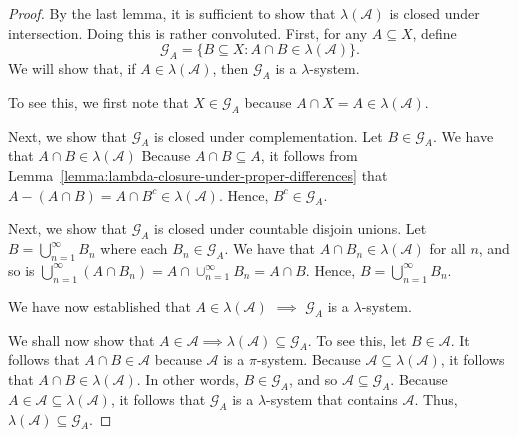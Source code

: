 \documentclass[10pt]{article}
\newcommand{\mcal}[1]{\mathcal{#1}}
\begin{document}
\begin{itemize}
\begin{proof}
    By the last lemma, it is sufficient to show that $\lambda(\mcal{A})$ is closed under intersection. Doing this is rather convoluted. First, for any $A \subseteq X$, define $$\mcal{G}_A = \{ B \subseteq X : A \cap B \in \mcal{\lambda}(\mcal{A}) \}.$$
    We will show that, if $A \in \lambda(\mcal{A})$, then $\mcal{G}_A$ is a $\lambda$-system. 

    To see this, we first note that $X \in \mcal{G}_A$ because $A \cap X = A \in \lambda(\mcal{A})$. 
    
    Next, we show that $\mcal{G}_A$ is closed under complementation. Let $B \in \mcal{G}_A$. We have that $A \cap B \in \lambda(\mcal{A})$ Because $A \cap B \subseteq A$, it follows from Lemma~\ref{lemma:lambda-closure-under-proper-differences} that $A - (A \cap B) = A \cap B^c \in \lambda(\mcal{A})$. Hence, $B^c \in \mcal{G}_A$.

    Next, we show that $\mcal{G}_A$ is closed under countable disjoin unions. Let $B = \bigcup_{n=1}^\infty B_n$ where each $B_n \in \mcal{G}_A$. We have that $A \cap B_n \in \lambda(\mcal{A})$ for all $n$, and so is $\bigcup_{n=1}^\infty (A \cap B_n) = A \cap \cup_{n=1}^\infty B_n = A \cap B$. Hence, $B = \bigcup_{n=1}^\infty B_n$.

    We have now established that $A \in \lambda(\mcal{A})$ $\implies$ $\mcal{G}_A$ is a $\lambda$-system.

    We shall now show that $A \in \mcal{A} \implies \lambda(\mcal{A}) \subseteq \mcal{G}_A$. To see this, let $B \in \mcal{A}$. It follows that $A \cap B \in \mcal{A}$ because $\mcal{A}$ is a $\pi$-system. Because $\mcal{A} \subseteq \lambda(\mcal{A})$, it follows that $A \cap B \in \lambda(\mcal{A})$. In other words, $B \in \mcal{G}_A$, and so $\mcal{A} \subseteq \mcal{G}_A$. Because $A \in \mcal{A} \subseteq \lambda(\mcal{A})$, it follows that $\mcal{G}_A$ is a $\lambda$-system that contains $\mcal{A}$. Thus, $\lambda(\mcal{A}) \subseteq \mcal{G}_A$.


\end{proof}
\end{itemize}
\end{document}
